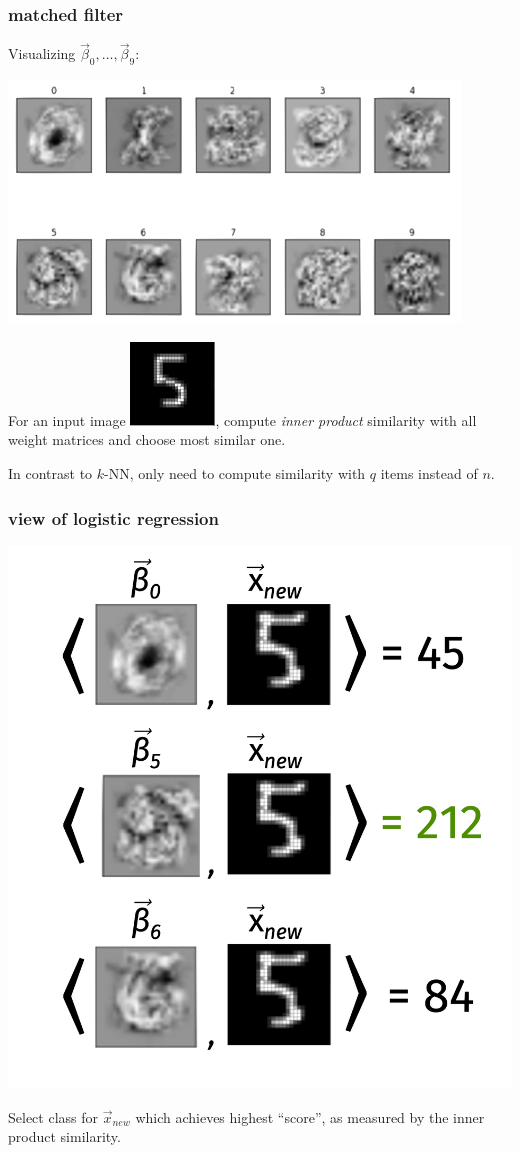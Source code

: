 \documentclass[handout,compress]{beamer}
\begin{document}
\begin{frame}
	\frametitle{matched filter}
	Visualizing $\vec{\beta}_0, \ldots, \vec{\beta}_{9}$:
	\begin{center}
		\includegraphics[width=.7\textwidth]{logweights.png}
	\end{center}
For an input image \hspace{.5em}\includegraphics[width=.05\textwidth]{five.png}\hspace{.5em}, compute \emph{inner product} similarity with all weight matrices and choose most similar one. 

In contrast to $k$-NN, only need to compute similarity with $q$ items instead of $n$.
\end{frame}

\begin{frame}
	\frametitle{view of logistic regression}
	\begin{center}
		\includegraphics[width=.5\textwidth]{orig_form.png}
		
		Select class for $\vec{x}_{new}$ which achieves highest ``score'', as measured by the inner product similarity.
	\end{center}
\end{frame}
\end{document}
